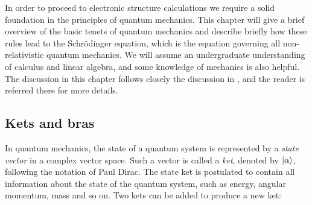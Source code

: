 In order to proceed to electronic structure calculations
we require a solid foundation in the principles of quantum mechanics.
This chapter will give a brief overview of the basic tenets
of quantum mechanics and describe briefly how these rules lead
to the Schr\"{o}dinger equation, which is the equation governing
all non-relativistic quantum mechanics.
We will assume an undergraduate understanding of calculus and linear algebra,
and some knowledge of mechanics is also helpful.
The discussion in this chapter follows closely the discussion in
\parencite[Sakurai][pages 10-76]{sakurai1995modern},
and the reader is referred there for more details.

\subsection{Kets and bras}
In quantum mechanics, the state of a quantum system
is represented by a \textit{state vector}
in a complex vector space. Such a vector is called a \textit{ket}, denoted
by $\ket{\alpha}$, following the notation of Paul Dirac.
The state ket is postulated to contain all information
about the state of the quantum system, such as energy, angular momentum,
mass and so on. Two kets can be added to produce a new ket:

